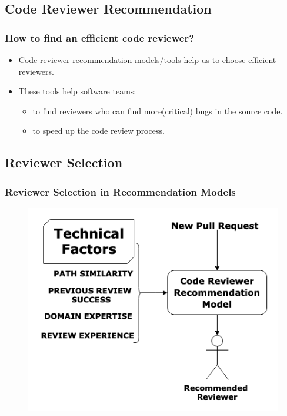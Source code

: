 \documentclass{beamer}
\begin{document}
\subsection{Code Reviewer Recommendation}

\begin{frame}
\frametitle{How to find an efficient code reviewer?}

    \begin{itemize}
    \item Code reviewer recommendation models/tools help us to choose efficient reviewers.
    \item These tools help software teams:
        \begin{itemize}
            \item to find reviewers who can find more(critical) bugs in the source code.
            \item to speed up the code review process.
        \end{itemize}
  \end{itemize}


\end{frame}




\subsection{Reviewer Selection}

\begin{frame}
\frametitle{\large Reviewer Selection in Recommendation Models }

  \begin{figure}
    \includegraphics[scale=0.5]{img/algos.png}
    \end{figure}

\end{frame}
\end{document}
